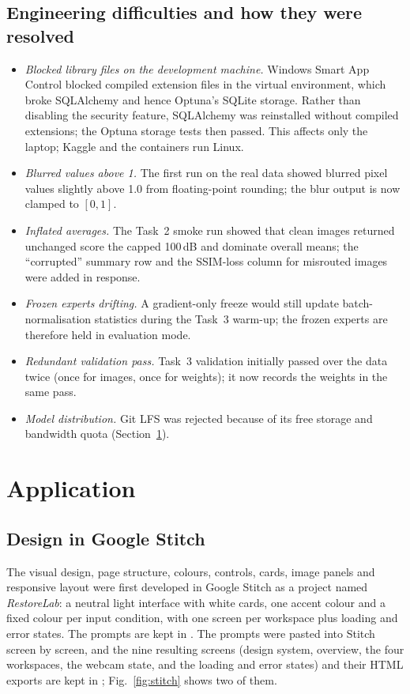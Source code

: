 \documentclass[conference]{IEEEtran}
\DeclareRobustCommand{\file}[1]{\expandafter\filepath\expandafter{\detokenize{#1}}}
\begin{document}
\subsection{Engineering difficulties and how they were resolved}
\begin{itemize}
  \item \emph{Blocked library files on the development machine.} Windows
  Smart App Control blocked compiled extension files in the virtual
  environment, which broke SQLAlchemy and hence Optuna's SQLite storage.
  Rather than disabling the security feature, SQLAlchemy was reinstalled
  without compiled extensions; the Optuna storage tests then passed. This
  affects only the laptop; Kaggle and the containers run Linux.
  \item \emph{Blurred values above 1.} The first run on the real data showed
  blurred pixel values slightly above 1.0 from floating-point rounding; the
  blur output is now clamped to $[0,1]$.
  \item \emph{Inflated averages.} The Task~2 smoke run showed that clean
  images returned unchanged score the capped 100\,dB and dominate overall
  means; the ``corrupted'' summary row and the SSIM-loss column for
  misrouted images were added in response.
  \item \emph{Frozen experts drifting.} A gradient-only freeze would still
  update batch-normalisation statistics during the Task~3 warm-up; the
  frozen experts are therefore held in evaluation mode.
  \item \emph{Redundant validation pass.} Task~3 validation initially passed
  over the data twice (once for images, once for weights); it now records
  the weights in the same pass.
  \item \emph{Model distribution.} Git LFS was rejected because of its free
  storage and bandwidth quota (Section~\ref{sec:app}).
\end{itemize}

\section{Application}
\label{sec:app}

\subsection{Design in Google Stitch}
The visual design, page structure, colours, controls, cards, image panels
and responsive layout were first developed in Google Stitch as a project
named \emph{RestoreLab}: a neutral light interface with white cards, one
accent colour and a fixed colour per input condition, with one screen per
workspace plus loading and error states. The prompts are kept in
\file{docs/stitch_prompts.md}.
The prompts were pasted into Stitch screen by screen, and the nine resulting
screens (design system, overview, the four workspaces, the webcam state, and
the loading and error states) and their HTML exports are kept in
\file{report/figures/stitch/}; Fig.~\ref{fig:stitch} shows two of them.
\end{document}
